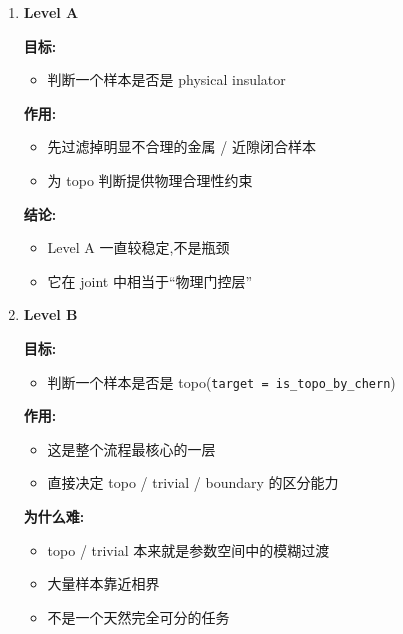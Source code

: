 \documentclass[lang=cn,scheme=chinese,color=blue,device=normal,toc=onecol,math=cm]{elegantbook}
\begin{document}
\begin{enumerate}
\item \textbf{Level A}\par
 
\textbf{目标:}\par
 
\begin{itemize}
\item 判断一个样本是否是 physical insulator
\end{itemize}
 
\textbf{作用:}\par
 
\begin{itemize}
\item 先过滤掉明显不合理的金属 /\allowbreak{} 近隙闭合样本
\item 为 topo 判断提供物理合理性约束
\end{itemize}
 
\textbf{结论:}\par
 
\begin{itemize}
\item Level A 一直较稳定,不是瓶颈
\item 它在 joint 中相当于“物理门控层”
\end{itemize}
\item \textbf{Level B}\par
 
\textbf{目标:}\par
 
\begin{itemize}
\item 判断一个样本是否是 topo(\texttt{target = is\_\allowbreak{}topo\_\allowbreak{}by\_\allowbreak{}chern})
\end{itemize}
 
\textbf{作用:}\par
 
\begin{itemize}
\item 这是整个流程最核心的一层
\item 直接决定 topo /\allowbreak{} trivial /\allowbreak{} boundary 的区分能力
\end{itemize}
 
\textbf{为什么难:}\par
 
\begin{itemize}
\item topo /\allowbreak{} trivial 本来就是参数空间中的模糊过渡
\item 大量样本靠近相界
\item 不是一个天然完全可分的任务
\end{itemize}
 

\end{enumerate}
\end{document}
